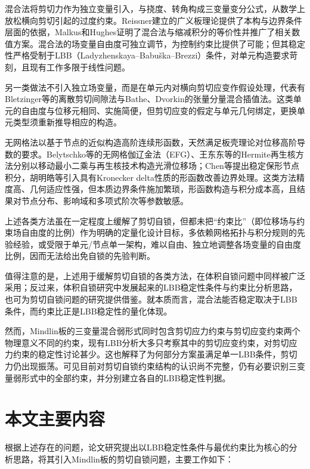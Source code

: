 \documentclass[internationalmaster]{hquThesis}
\begin{document}
混合法将剪切力作为独立变量引入，与挠度、转角构成三变量变分公式，从数学上放松横向剪切引起的过度约束。Reissner建立的广义板理论提供了本构与边界条件层面的依据\cite{reissner1947}，Malkus和Hughes证明了混合法与缩减积分的等价性并推广了相关数值方案\cite{malkus1978}。混合法的场变量自由度可独立调节，为控制约束比提供了可能；但其稳定性严格受制于LBB（Ladyzhenskaya--Babu\v{s}ka--Brezzi）条件，对单元构造要求苛刻\cite{hughes1980}，且现有工作多限于线性问题。

另一类做法不引入独立场变量，而是在单元内对横向剪切应变作假设处理，代表有Bletzinger等的离散剪切间隙法\cite{bletzinger2000}与Bathe、Dvorkin的张量分量混合插值法\cite{bathe1985}。这类单元的自由度与位移元相同、实施简便，但剪切应变的假定与单元几何绑定，更换单元类型须重新推导相应的构造。

无网格法以基于节点的近似构造高阶连续形函数，天然满足板壳理论对位移高阶导数的要求。Belytschko等的无网格伽辽金法（EFG）\cite{belytschko1995}、王东东等的Hermite再生核方法\cite{wang2013}分别以移动最小二乘与再生核技术构造光滑位移场；Chen等提出稳定保形节点积分\cite{chen2001}，胡明皓等引入具有Kronecker delta性质的形函数改善边界处理\cite{LXXB202307012}。这类方法精度高、几何适应性强，但本质边界条件施加繁琐\cite{LXXB202001010,LXXB202307012}，形函数构造与积分成本高\cite{JSJG200904011}，且结果对节点分布、影响域和多项式阶次等参数敏感\cite{JSJG200904011,LXXB202201009}。

上述各类方法虽在一定程度上缓解了剪切自锁，但都未把``约束比''（即位移场与约束场自由度的比例）作为明确的定量化设计目标，多依赖网格拓扑与积分规则的先验经验，或受限于单元/节点单一架构，难以自由、独立地调整各场变量的自由度比例，因而无法给出免自锁的先验判断。

值得注意的是，上述用于缓解剪切自锁的各类方法，在体积自锁问题中同样被广泛采用；反过来，体积自锁研究中发展起来的LBB稳定性条件与约束比分析思路，也可为剪切自锁问题的研究提供借鉴。就本质而言，混合法能否稳定取决于LBB条件，而约束比正是LBB稳定性的量化体现。

然而，Mindlin板的三变量混合弱形式同时包含剪切应力约束与剪切应变约束两个物理意义不同的约束，现有LBB分析大多只考察其中的剪切应变约束，对剪切应力约束的稳定性讨论甚少。这也解释了为何部分方案虽满足单一LBB条件，剪切力仍出现振荡。可见目前对剪切自锁约束结构的认识尚不完整，仍有必要识别三变量弱形式中的全部约束，并分别建立各自的LBB稳定性判据。

\section{本文主要内容}

根据上述存在的问题，论文研究提出以LBB稳定性条件与最优约束比为核心的分析思路，将其引入Mindlin板的剪切自锁问题，主要工作如下：
\end{document}
